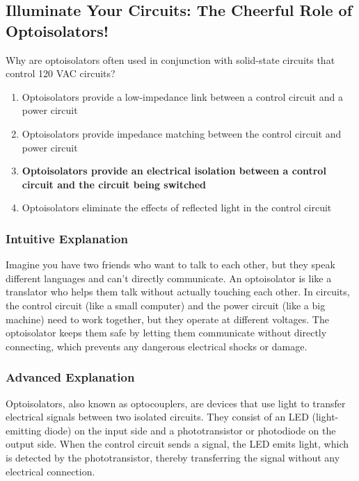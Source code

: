 \subsection{Illuminate Your Circuits: The Cheerful Role of Optoisolators!}

\begin{tcolorbox}[colback=gray!10!white,colframe=black!75!black,title=E6F08] Why are optoisolators often used in conjunction with solid-state circuits that control 120 VAC circuits?
    \begin{enumerate}[label=\Alph*)]
        \item Optoisolators provide a low-impedance link between a control circuit and a power circuit
        \item Optoisolators provide impedance matching between the control circuit and power circuit
        \item \textbf{Optoisolators provide an electrical isolation between a control circuit and the circuit being switched}
        \item Optoisolators eliminate the effects of reflected light in the control circuit
    \end{enumerate}
\end{tcolorbox}

\subsubsection{Intuitive Explanation}
Imagine you have two friends who want to talk to each other, but they speak different languages and can't directly communicate. An optoisolator is like a translator who helps them talk without actually touching each other. In circuits, the control circuit (like a small computer) and the power circuit (like a big machine) need to work together, but they operate at different voltages. The optoisolator keeps them safe by letting them communicate without directly connecting, which prevents any dangerous electrical shocks or damage.

\subsubsection{Advanced Explanation}
Optoisolators, also known as optocouplers, are devices that use light to transfer electrical signals between two isolated circuits. They consist of an LED (light-emitting diode) on the input side and a phototransistor or photodiode on the output side. When the control circuit sends a signal, the LED emits light, which is detected by the phototransistor, thereby transferring the signal without any electrical connection.

